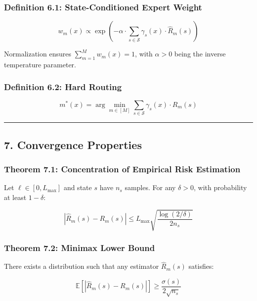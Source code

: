 \documentclass[
  12pt,
]{ctexart}
\begin{document}
\subsubsection{Definition 6.1: State-Conditioned Expert Weight}\label{definition-6.1-state-conditioned-expert-weight}

\[w_m(x) \propto \exp\left(-\alpha \cdot \sum_{s \in \mathcal{S}} \gamma_s(x) \cdot \hat{R}_m(s)\right)\]

Normalization ensures \(\sum_{m=1}^M w_m(x) = 1\), with \(\alpha > 0\) being the inverse temperature parameter.

\subsubsection{Definition 6.2: Hard Routing}\label{definition-6.2-hard-routing}

\[m^*(x) = \arg\min_{m \in [M]} \sum_{s \in \mathcal{S}} \gamma_s(x) \cdot R_m(s)\]

\begin{center}\rule{0.5\linewidth}{0.5pt}\end{center}

\subsection{7. Convergence Properties}\label{convergence-properties}

\subsubsection{Theorem 7.1: Concentration of Empirical Risk Estimation}\label{theorem-7.1-concentration-of-empirical-risk-estimation}

Let \(\ell \in [0, L_{\max}]\) and state \(s\) have \(n_s\) samples. For any
\(\delta > 0\), with probability at least \(1 - \delta\):

\[|\hat{R}_m(s) - R_m(s)| \leq L_{\max} \sqrt{\frac{\log(2/\delta)}{2n_s}}\]

\subsubsection{Theorem 7.2: Minimax Lower Bound}\label{theorem-7.2-minimax-lower-bound}

There exists a distribution such that any estimator \(\hat{R}_m(s)\) satisfies:

\[\mathbb{E}[|\hat{R}_m(s) - R_m(s)|] \geq \frac{\sigma(s)}{2\sqrt{n_s}}\]
\end{document}

